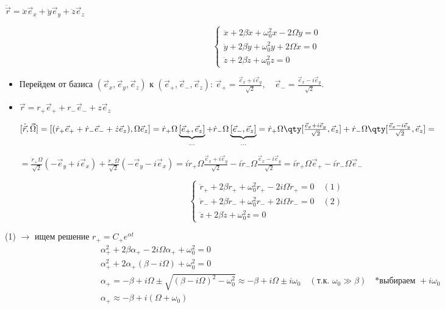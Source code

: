 $\ddot{\vec{r}} = \ddot{x}\vec{e}_x + \ddot{y}\vec{e}_y + \ddot{z}\vec{e}_z$

\begin{equation}
	\begin{cases}
		\ddot{x} + 2\beta\dot{x} + \omega_0^2 x - 2\Omega\dot{y} = 0 \\
		\ddot{y} + 2\beta\dot{y} + \omega_0^2 y + 2\Omega\dot{x} = 0 \\
		\ddot{z} + 2\beta\dot{z} + \omega_0^2 z = 0
	\end{cases}
\end{equation}

\begin{itemize}
	\item Перейдем от базиса $(\vec{e}_x, \vec{e}_y, \vec{e}_z)$ к $(\vec{e}_+, \vec{e}_-, \vec{e}_z)$: \quad $\vec{e}_+ = \frac{\vec{e}_x + i\vec{e}_y}{\sqrt{2}}, \quad \vec{e}_- = \frac{\vec{e}_x - i\vec{e}_y}{\sqrt{2}}$.
	
	\item $\vec{r} = r_+\vec{e}_+ + r_-\vec{e}_- + z\vec{e}_z$
	
	$[\dot{\vec{r}}, \vec{\Omega}] = [ (\dot{r}_+\vec{e}_+ + \dot{r}_-\vec{e}_- + \dot{z}\vec{e}_z), \Omega\vec{e}_z ] = \dot{r}_+ \Omega \underbrace{[\vec{e}_+, \vec{e}_z]}_{\dots} + \dot{r}_- \Omega \underbrace{[\vec{e}_-, \vec{e}_z]}_{\dots} = \dot{r}_+ \Omega \qty[ \frac{\vec{e}_x + i\vec{e}_y}{\sqrt{2}}, \vec{e}_z ] + \dot{r}_- \Omega \qty[ \frac{\vec{e}_x - i\vec{e}_y}{\sqrt{2}}, \vec{e}_z ] = $
	
	$ = \frac{\dot{r}_+ \Omega}{\sqrt{2}} (-\vec{e}_y + i\vec{e}_x) + \frac{\dot{r}_- \Omega}{\sqrt{2}} (-\vec{e}_y - i\vec{e}_x) = i \dot{r}_+ \Omega \frac{\vec{e}_x + i\vec{e}_y}{\sqrt{2}} - i \dot{r}_- \Omega \frac{\vec{e}_x - i\vec{e}_y}{\sqrt{2}} = i \dot{r}_+ \Omega \vec{e}_+ - i \dot{r}_- \Omega \vec{e}_-$
\end{itemize}

\begin{equation*}
	\begin{cases}
		\ddot{r}_+ + 2\beta\dot{r}_+ + \omega_0^2 r_+ - 2i\Omega\dot{r}_+ = 0 \quad (1) \\
		\ddot{r}_- + 2\beta\dot{r}_- + \omega_0^2 r_- + 2i\Omega\dot{r}_- = 0 \quad (2) \\
		\ddot{z} + 2\beta\dot{z} + \omega_0^2 z = 0
	\end{cases}
\end{equation*}

(1) $\to$ ищем решение $r_+ = C_+ e^{\alpha t}$
\begin{align*}
	& \alpha_+^2 + 2\beta\alpha_+ - 2i\Omega\alpha_+ + \omega_0^2 = 0 \\
	& \alpha_+^2 + 2\alpha_+(\beta - i\Omega) + \omega_0^2 = 0 \\
	& \alpha_+ = -\beta + i\Omega \pm \sqrt{(\beta - i\Omega)^2 - \omega_0^2} \approx -\beta + i\Omega \pm i\omega_0 \quad (\text{т.к. } \omega_0 \gg \beta) \quad \text{*выбираем } +i\omega_0 \\
	& \alpha_+ \approx -\beta + i(\Omega + \omega_0)
\end{align*}

